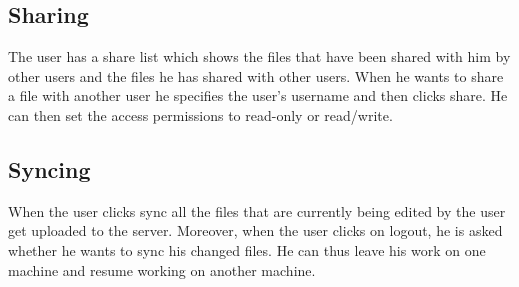 \documentclass[]{article}
\begin{document}
\subsection{Sharing}The user has a share list which shows the files that have been shared with him by other users and the files he has shared with other users. When he wants to share a file with another user he specifies the user's username and then clicks share. He can then set the access permissions to read-only or read/write.
\subsection{Syncing}When the user clicks sync all the files that are currently being edited by the user get uploaded to the server. Moreover, when the user clicks on logout, he is asked whether he wants to sync his changed files. He can thus leave his work on one machine and resume working on another machine.
\end{document}
